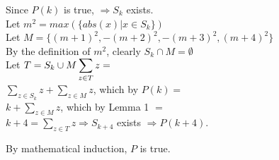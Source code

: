 \documentclass[fleqn]{article}
\begin{document}
Since $P(k)$ is true, $\Rightarrow S_{k}$ exists.\\
Let $m^2 = max(\lbrace abs(x) | x \in S_{k} \rbrace)$\\
Let $M = \lbrace (m+1)^2, -(m+2)^2, -(m+3)^2, (m+4)^2 \rbrace$\\
By the definition of $m^2$, clearly $S_{k} \cap M = \emptyset$\\
Let $T = S_{k} \cup M \\
\displaystyle\sum\limits_{z \in T} z =$\\
$\displaystyle\sum\limits_{z \in S_{k}} z + \displaystyle\sum\limits_{z \in M} z$, which by $P(k) =$\\
$k + \displaystyle\sum\limits_{z \in M} z$, which by Lemma 1 $=$\\
$k + 4 = \displaystyle\sum\limits_{z \in T} z \Rightarrow S_{k+4}$ exists $\Rightarrow P(k+4)$.

By mathematical induction, $P$ is true.
\end{document}
